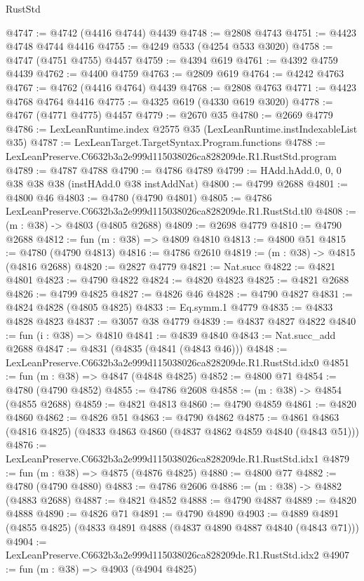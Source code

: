 \begin{lexlean}{RustStd}
\begin{coremodule}
@4747 := @4742 (@4416 @4744) @4439
@4748 := @2808 @4743
@4751 := @4423 @4748 @4744 @4416
@4755 := @4249 @533 (@4254 @533 @3020)
@4758 := @4747 (@4751 @4755) @4457
@4759 := @4394 @619
@4761 := @4392 @4759 @4439
@4762 := @4400 @4759
@4763 := @2809 @619
@4764 := @4242 @4763
@4767 := @4762 (@4416 @4764) @4439
@4768 := @2808 @4763
@4771 := @4423 @4768 @4764 @4416
@4775 := @4325 @619 (@4330 @619 @3020)
@4778 := @4767 (@4771 @4775) @4457
@4779 := @2670 @35
@4780 := @2669 @4779
@4786 := LexLeanRuntime.index @2575 @35 (LexLeanRuntime.instIndexableList @35)
@4787 := LexLeanTarget.TargetSyntax.Program.functions
@4788 := LexLeanPreserve.C6632b3a2e999d115038026ca828209de.R1.RustStd.program
@4789 := @4787 @4788
@4790 := @4786 @4789
@4799 := HAdd.hAdd.{0, 0, 0} @38 @38 @38 (instHAdd.{0} @38 instAddNat)
@4800 := @4799 @2688
@4801 := @4800 @46
@4803 := @4780 (@4790 @4801)
@4805 := @4786 LexLeanPreserve.C6632b3a2e999d115038026ca828209de.R1.RustStd.tl0
@4808 := (m : @38) -> @4803 (@4805 @2688)
@4809 := @2698 @4779
@4810 := @4790 @2688
@4812 := fun (m : @38) => @4809 @4810
@4813 := @4800 @51
@4815 := @4780 (@4790 @4813)
@4816 := @4786 @2610
@4819 := (m : @38) -> @4815 (@4816 @2688)
@4820 := @2827 @4779
@4821 := Nat.succ
@4822 := @4821 @4801
@4823 := @4790 @4822
@4824 := @4820 @4823
@4825 := @4821 @2688
@4826 := @4799 @4825
@4827 := @4826 @46
@4828 := @4790 @4827
@4831 := @4824 @4828 (@4805 @4825)
@4833 := Eq.symm.{1} @4779
@4835 := @4833 @4828 @4823
@4837 := @3057 @38 @4779
@4839 := @4837 @4827 @4822
@4840 := fun (i : @38) => @4810
@4841 := @4839 @4840
@4843 := Nat.succ_add @2688
@4847 := @4831 (@4835 (@4841 (@4843 @46)))
@4848 := LexLeanPreserve.C6632b3a2e999d115038026ca828209de.R1.RustStd.idx0
@4851 := fun (m : @38) => @4847 (@4848 @4825)
@4852 := @4800 @71
@4854 := @4780 (@4790 @4852)
@4855 := @4786 @2608
@4858 := (m : @38) -> @4854 (@4855 @2688)
@4859 := @4821 @4813
@4860 := @4790 @4859
@4861 := @4820 @4860
@4862 := @4826 @51
@4863 := @4790 @4862
@4875 := @4861 @4863 (@4816 @4825) (@4833 @4863 @4860 (@4837 @4862 @4859 @4840 (@4843 @51)))
@4876 := LexLeanPreserve.C6632b3a2e999d115038026ca828209de.R1.RustStd.idx1
@4879 := fun (m : @38) => @4875 (@4876 @4825)
@4880 := @4800 @77
@4882 := @4780 (@4790 @4880)
@4883 := @4786 @2606
@4886 := (m : @38) -> @4882 (@4883 @2688)
@4887 := @4821 @4852
@4888 := @4790 @4887
@4889 := @4820 @4888
@4890 := @4826 @71
@4891 := @4790 @4890
@4903 := @4889 @4891 (@4855 @4825) (@4833 @4891 @4888 (@4837 @4890 @4887 @4840 (@4843 @71)))
@4904 := LexLeanPreserve.C6632b3a2e999d115038026ca828209de.R1.RustStd.idx2
@4907 := fun (m : @38) => @4903 (@4904 @4825)

\end{coremodule}
\end{lexlean}

